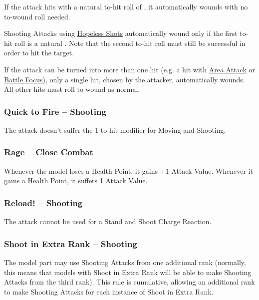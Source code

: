 If the attack hits with a natural to-hit roll of , it automatically wounds with no to-wound roll needed.

Shooting Attacks using \hyperref[hopeless_shots]{Hopeless Shots} automatically wound only if the first to-hit roll is a natural . Note that the second to-hit roll must still be successful in order to hit the target.

If the attack can be turned into more than one hit (e.g. a hit with \hyperref[area_attack]{Area Attack} or \hyperref[battle_focus]{Battle Focus}), only a single hit, chosen by the attacker, automatically wounds. All other hits must roll to wound as normal.

\subsubsection{Quick to Fire -- Shooting}
\idx[main=y]{\quicktofire}\label{quick_to_fire}

The attack doesn't suffer the \minuss{}1 to-hit modifier for Moving and Shooting.

\subsubsection{Rage -- Close Combat}
\idx[main=y]{\rage}\label{rage}

 Whenever the model loses a Health Point, it gains +1 Attack Value. Whenever it gains a Health Point, it suffers \minuss{}1 Attack Value.

\subsubsection{Reload! -- Shooting}
\label{reload}

The attack cannot be used for a Stand and Shoot Charge Reaction.

\subsubsection{Shoot in Extra Rank -- Shooting}
\idx[main=y]{\shootinextrarank}\label{shoot_in_extra_rank}

The model part may use Shooting Attacks from one additional rank (normally, this means that models with Shoot in Extra Rank will be able to make Shooting Attacks from the third rank). This rule is cumulative, allowing an additional rank to make Shooting Attacks for each instance of Shoot in Extra Rank.

